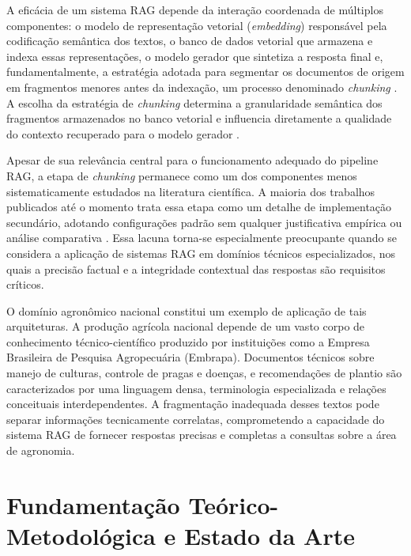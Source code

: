 \documentclass[
	12pt,				%
	openright,			%
	oneside,			%
	a4paper,			%
	tccpreliminar,		%
	]{ABNT-DC-UEL}
\begin{document}
A eficácia de um sistema RAG depende da interação coordenada de múltiplos componentes: o modelo de representação vetorial (\textit{embedding}) responsável pela codificação semântica dos textos, o banco de dados vetorial que armazena e indexa essas representações, o modelo gerador que sintetiza a resposta final e, fundamentalmente, a estratégia adotada para segmentar os documentos de origem em fragmentos menores antes da indexação, um processo denominado \textit{chunking} \cite{finardi2024chronicles}. A escolha da estratégia de \textit{chunking} determina a granularidade semântica dos fragmentos armazenados no banco vetorial e influencia diretamente a qualidade do contexto recuperado para o modelo gerador \cite{wang2024bestpractices}.

Apesar de sua relevância central para o funcionamento adequado do pipeline RAG, a etapa de \textit{chunking} permanece como um dos componentes menos sistematicamente estudados na literatura científica. A maioria dos trabalhos publicados até o momento trata essa etapa como um detalhe de implementação secundário, adotando configurações padrão sem qualquer justificativa empírica ou análise comparativa \cite{barnett2024failure}. Essa lacuna torna-se especialmente preocupante quando se considera a aplicação de sistemas RAG em domínios técnicos especializados, nos quais a precisão factual e a integridade contextual das respostas são requisitos críticos.

O domínio agronômico nacional constitui um exemplo de aplicação de tais arquiteturas. A produção agrícola nacional depende de um vasto corpo de conhecimento técnico-científico produzido por instituições como a Empresa Brasileira de Pesquisa Agropecuária (Embrapa). Documentos técnicos sobre manejo de culturas, controle de pragas e doenças, e recomendações de plantio são caracterizados por uma linguagem densa, terminologia especializada e relações conceituais interdependentes. A fragmentação inadequada desses textos pode separar informações tecnicamente correlatas, comprometendo a capacidade do sistema RAG de fornecer respostas precisas e completas a consultas sobre a área de agronomia.



\chapter{Fundamentação Teórico-Metodológica e Estado da Arte}
\label{cap:fundamentacao}
\end{document}
